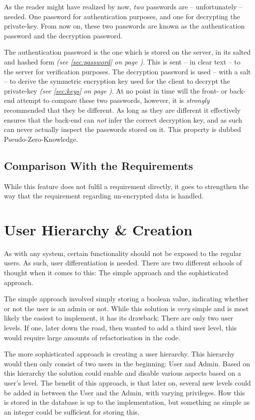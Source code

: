 		As the reader might have realized by now, \emph{two} passwords are -- unfortunately -- needed. One password for authentication purposes, and one for decrypting the private-key. From now on, these two passwords are known as the authentication password and the decryption password.
 
		The authentication password is the one which is stored on the server, in its salted and hashed form \emph{(see \ref{sec:password} on page \pageref{sec:password})}. This is sent -- in clear text -- to the server for verification purposes. The decryption password is used -- with a salt -- to derive the symmetric encryption key used for the client to decrypt the private-key \emph{(see \ref{sec:keys} on page \pageref{sec:keys})}. At no point in time will the front- or back-end attempt to compare these two passwords, however, it is \emph{strongly} recommended that they be different. As long as they are different it effectively ensures that the back-end can \emph{not} infer the correct decryption key, and as such can never actually inspect the passwords stored on it. This property is dubbed Pseudo-Zero-Knowledge.

		\subsection{Comparison With the Requirements}
			While this feature does not fulfil a requirement directly, it goes to strengthen the way that the requirement regarding un-encrypted data is handled.

	\section{User Hierarchy \& Creation}
		\label{sec:user:diff}
		As with any system, certain functionality should not be exposed to the regular users. As such, user differentiation is needed. There are two different schools of thought when it comes to this: The simple approach and the sophisticated approach.

		The simple approach involved simply storing a boolean value, indicating whether or not the user is an admin or not. While this solution is \emph{very} simple and is most likely the easiest to implement, it has its drawback: There are only two user levels. If one, later down the road, then wanted to add a third user level, this would require large amounts of refactorisation in the code.

		The more sophisticated approach is creating a user hierarchy. This hierarchy would then only consist of two users in the beginning: User and Admin. Based on this hierarchy the solution could enable and disable various aspects based on a user's level. The benefit of this approach, is that later on, several new levels could be added in between the User and the Admin, with varying privileges. How this is stored in the database is up to the implementation, but something as simple as an integer could be sufficient for storing this.

